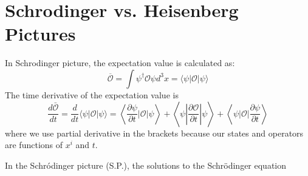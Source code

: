 \section{Schrodinger vs. Heisenberg Pictures}
In Schrodinger picture, the expectation value is calculated as:
$$
\overline{\mathcal{O}}=\int \psi^{\dagger} \mathcal{O} \psi d^{3} x=\langle\psi|\mathcal{O}| \psi\rangle
$$
The time derivative of the expectation value is
\begin{equation}
\frac{d \bar{\mathcal{O}}}{d t}=\frac{d}{d t}\langle\psi|\mathcal{O}| \psi\rangle=\left\langle\frac{\partial \psi}{\partial t}|\mathcal{O}| \psi\right\rangle+\left\langle\psi\left|\frac{\partial \mathcal{O}}{\partial t}\right| \psi\right\rangle+\left\langle\psi|\mathcal{O}| \frac{\partial \psi}{\partial t}\right\rangle
\end{equation}
where we use partial derivative in the brackets because our states and operators are functions of $x^i$ and $t$.

In the Schródinger picture (S.P.), the solutions to the Schrödinger equation

